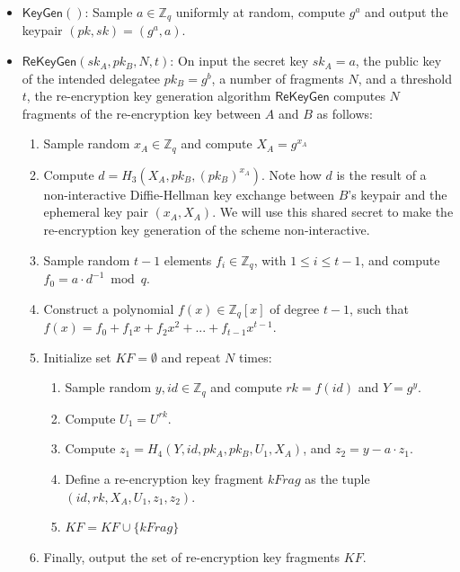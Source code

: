 \documentclass{amsart}
\begin{document}
\begin{itemize}
	\item $\mathsf{KeyGen}()$: Sample $a \in \mathbb Z_q$ uniformly at random, compute $g^a$ and output the keypair $(pk, sk) = (g^a, a)$.

	\item $\mathsf{ReKeyGen}(sk_A, pk_B, N, t)$: On input the secret key $sk_{A} = a$, the public key of the intended delegatee $pk_{B} = g^b$, a number of fragments $N$, and a threshold $t$, the re-encryption key generation algorithm $\mathsf{ReKeyGen}$ computes $N$ fragments of the re-encryption key between $A$ and $B$ as follows:
	
	\begin{enumerate}
\item Sample random $x_A \in \mathbb Z_q$ and compute $X_A = g^{x_A}$
\item Compute $ d = H_3(X_A, pk_B, (pk_B)^{x_A})$. Note how $d$ is the result of a non-interactive Diffie-Hellman key exchange between $B$'s keypair and the ephemeral key pair $(x_A, X_A)$. We will use this shared secret to make the re-encryption key generation of the scheme non-interactive.
\item Sample random $t-1$ elements $f_i\in \mathbb Z_q$, with $1 \leq i \leq t-1$, and  compute $f_0 = a \cdot d^{-1} \bmod q$.
\item Construct a polynomial $f(x) \in \mathbb Z_q[x]$ of degree $t-1$, such that $f(x) = f_0 + f_1x + f_2x^2 + ... + f_{t-1}x^{t-1}$.  
\item Initialize set $KF = \emptyset$ and repeat $N$ times:

    \begin{enumerate}
    \item Sample random $y, id \in \mathbb Z_q$ and compute $rk = f(id)$ and $Y = g^y$.
    \item Compute $U_1 = U^{rk}$.
    \item Compute $z_1 = H_4(Y, id, pk_A, pk_B, U_1, X_A)$, and $z_2 = y - a \cdot z_1$.
    \item Define a re-encryption key fragment $kFrag$ as the tuple $(id, rk, X_A, U_1, z_1, z_2)$.
    \item $KF = KF \cup \{kFrag\}$
	\end{enumerate}

\item Finally, output the set of re-encryption key fragments $KF$.
\end{enumerate}
\end{itemize}
\end{document}
